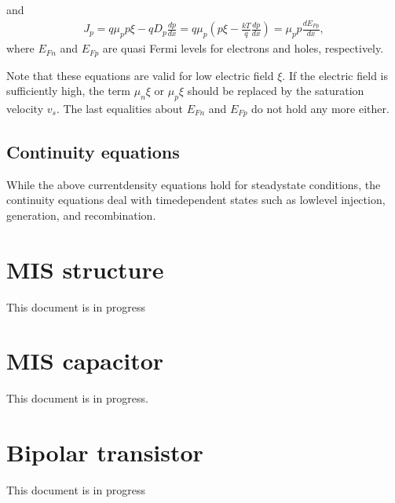 \documentclass[letterpaper,10pt,english]{sphinxmanual}
\numberwithin{equation}{section}
\begin{document}
\sphinxAtStartPar
and
\begin{equation}\label{equation:Basic_equation:hole_current_quasi_fermi}
\begin{split}J_p = q\mu_pp\xi - qD_p\frac{dp}{dx} = q\mu_p\left(p\xi - \frac{kT}{q}\frac{dp}{dx}\right) = \mu_pp\frac{dE_{Fp}}{dx},\end{split}
\end{equation}
\sphinxAtStartPar
where \(E_{Fn}\) and \(E_{Fp}\) are quasi Fermi levels for electrons and holes, respectively.

\sphinxAtStartPar
Note that these equations are valid for low electric field \(\xi\).
If the electric field is sufficiently high, the term \(\mu_n\xi\) or \(\mu_p\xi\) should be replaced by the saturation velocity \(v_s\).
The last equalities about \(E_{Fn}\) and \(E_{Fp}\) do not hold any more either.


\subsection{Continuity equations}
\label{\detokenize{Basic_equation:continuity-equations}}
\sphinxAtStartPar
While the above current\sphinxhyphen{}density equations hold for steady\sphinxhyphen{}state conditions, the continuity equations deal with time\sphinxhyphen{}dependent states such as low\sphinxhyphen{}level injection, generation, and recombination.

\sphinxstepscope


\section{MIS structure}
\label{\detokenize{MIS_structure:mis-structure}}\label{\detokenize{MIS_structure::doc}}
\sphinxAtStartPar
This document is in progress

\sphinxstepscope


\section{MIS capacitor}
\label{\detokenize{MIS_capacitor:mis-capacitor}}\label{\detokenize{MIS_capacitor::doc}}
\sphinxAtStartPar
This document is in progress.

\sphinxstepscope


\section{Bipolar transistor}
\label{\detokenize{Bipolar_transistor:bipolar-transistor}}\label{\detokenize{Bipolar_transistor::doc}}
\sphinxAtStartPar
This document is in progress
\end{document}
